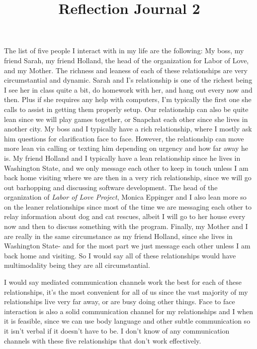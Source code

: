 \documentclass[12pt]{article}
\begin{document}
\title{Reflection Journal 2}
\par
The list of five people I interact with in my life are the following: My boss, my friend Sarah, my friend Holland, the head of the organization for Labor of Love, and my Mother. The richness and leaness of each of these relationships are very circumstantial and dynamic. Sarah and I's relationship is one of the richest being I see her in class quite a bit, do homework with her, and hang out every now and then. Plus if she requires any help with computers, I'm typically the first one she calls to assist in getting them properly setup. Our relationship can also be quite lean since we will play games together, or Snapchat each other since she lives in another city. My boss and I typically have a rich relationship, where I mostly ask him questions for clarification face to face. However, the relationship can move more lean via calling or texting him depending on urgency and how far away he is. My friend Holland and I typically have a lean relationship since he lives in Washington State, and we only message each other to keep in touch unless I am back home visiting where we are then in a very rich relationship, since we will go out barhopping and discussing software development. The head of the organization of \emph{Labor of Love Project}, Monica Eppinger and I also lean more so on the leaner relationships since most of the time we are messaging each other to relay information about dog and cat rescues, albeit I will go to her house every now and then to discuss something with the program. Finally, my Mother and I are really in the same circumstance as my friend Holland, since she lives in Washington State- and for the most part we just message each other unless I am back home and visiting. So I would say all of these relationships would have multimodality being they are all circumstantial.
\par
I would say mediated communication channels work the best for each of these relationships, it's the most convenient for all of us since the vast majority of my relationships live very far away, or are busy doing other things. Face to face interaction is also a solid communication channel for my relationships and I when it is feasible, since we can use body language and other subtle communication so it isn't verbal if it doesn't have to be. I don't know of any communication channels with these five relationships that don't work effectively.
\end{document}
